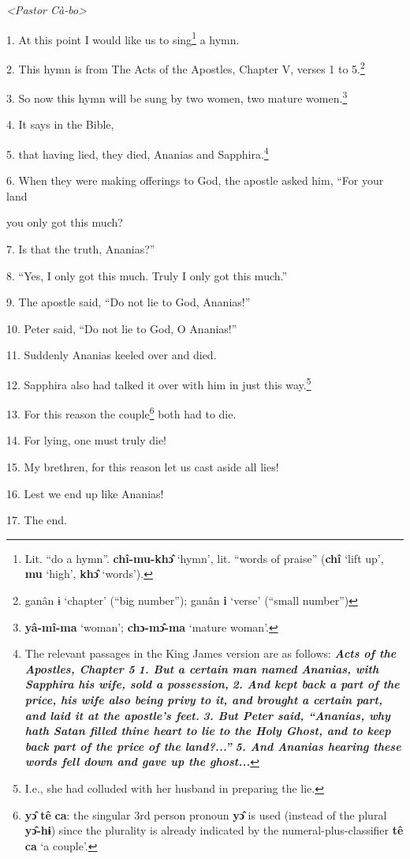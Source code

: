 \setcounter{footnote}{0}

\textit{<Pastor Cà-bo> }

1. At this point I would like us to sing\footnote{Lit. ``do a hymn''. \textbf{chî-mu-khɔ̂} `hymn', lit. ``words of praise'' (\textbf{chî} `lift up', \textbf{mu} `high', \textbf{khɔ̂} `words').} a hymn.

2. This hymn is from The Acts of the Apostles, Chapter V, verses 1 to 5.\footnote{ganân ɨ `chapter' (``big number''); ganân \textbf{i} `verse' (``small number'')}

3. So now this hymn will be sung by two women, two mature women.\footnote{\textbf{yâ-mî-ma} `woman'; \textbf{chɔ-mɔ̂-ma} `mature woman'.}

\textit{}

4. It says in the Bible,

5. that having lied, they died, Ananias and Sapphira.\footnote{The relevant passages in the King James version are as follows: \textit{\textbf{Acts of the Apostles, Chapter 5}} \textit{\textbf{1. But a certain man named Ananias, with Sapphira his wife, sold a possession,}} \textit{\textbf{2. And kept back a part of the price, his wife also being privy to it, and brought a certain part, and laid it at the apostle's feet.}} \textit{\textbf{3. But Peter said, ``Ananias, why hath Satan filled thine heart to lie to the Holy Ghost, and to keep back part of the price of the land?...''}} \textit{\textbf{5. And Ananias hearing these words fell down and gave up the ghost...}}}

6. When they were making offerings to God, the apostle asked him, ``For your land


you only got this much?

7. Is that the truth, Ananias?''

8. ``Yes, I only got this much. Truly I only got this much.''

9. The apostle said, ``Do not lie to God, Ananias!''

10. Peter said, ``Do not lie to God, O Ananias!''

11. Suddenly Ananias keeled over and died.

12. Sapphira also had talked it over with him in just this way.\footnote{I.e., she had colluded with her husband in preparing the lie.}

13. For this reason the couple\footnote{\textbf{yɔ̂} \textbf{tê} \textbf{ca}: the singular 3rd person pronoun \textbf{yɔ̂} is used (instead of the plural \textbf{yɔ̂-hɨ}) since the plurality is already indicated by the numeral-plus-classifier \textbf{tê} \textbf{ca} `a couple'.} both had to die.

14. For lying, one must truly die!

15. My brethren, for this reason let us cast aside all lies!

16. Lest we end up like Ananias!

17. The end.

